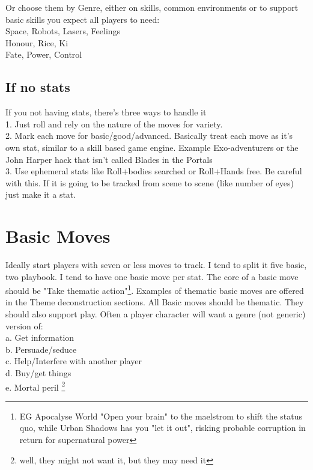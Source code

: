 \documentclass{tufte-handout}
\begin{document}
Or choose them by Genre, either on skills, common environments or to support basic skills you expect all players to need:\\ 

Space, Robots, Lasers,  Feelings\\
Honour, Rice, Ki\\
Fate, Power, Control \\

\subsection{If no stats}
If you not having stats, there's three ways to  handle it\\
1. Just roll and rely on the nature of the moves for variety.\\
2. Mark each move for basic/good/advanced. Basically treat each move as it's own stat, similar to a skill based game engine. Example  {Exo-adventurers or the John Harper hack that isn't called Blades in the Portals}\\
3. Use ephemeral stats like Roll+bodies searched or Roll+Hands free. Be careful with this. If it is going to be tracked from scene to scene (like number of eyes) just make it a stat.

\section{Basic Moves}
Ideally start players with seven or less moves to track. I tend to split it five basic, two playbook. I tend to have one basic move per stat. The core of a basic move should be "Take thematic action"\footnote{EG Apocalyse World "Open your brain" to the maelstrom to shift the status quo, while Urban Shadows has you "let it out", risking probable corruption in return for supernatural power}. Examples of thematic basic moves are offered in the Theme deconstruction sections.
All Basic moves should be thematic. They should also support play. Often a player character will want a genre (not generic) version of:\\
a. Get information\\
b. Persuade/seduce\\
c. Help/Interfere with another player\\
d. Buy/get things\\
e. Mortal peril \footnote{well, they might not want it, but they may need it}\\
\end{document}
